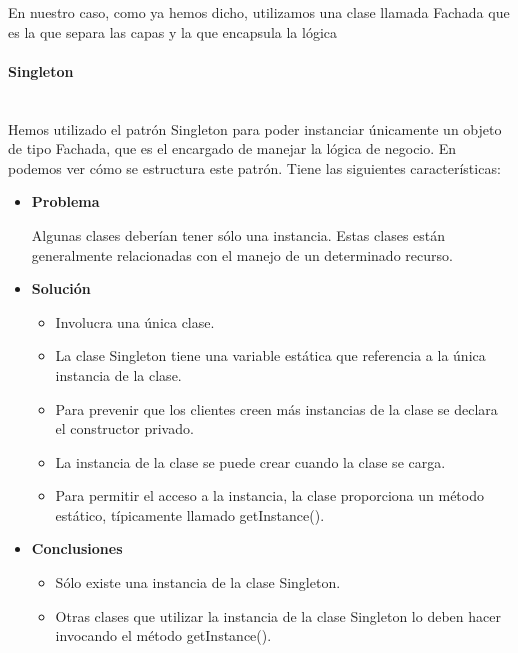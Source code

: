En nuestro caso, como ya hemos dicho, utilizamos una clase llamada Fachada que es la que separa las capas y la que encapsula la lógica 


\paragraph{Singleton}\mbox{} \\
\indent Hemos utilizado el patrón Singleton para poder instanciar únicamente un objeto de tipo Fachada, que es el encargado de manejar la lógica de negocio. En  podemos ver cómo se estructura este patrón. Tiene las siguientes características:



\begin{itemize}
\item \textbf{Problema}

Algunas clases deberían tener sólo una instancia. Estas clases están generalmente relacionadas con el manejo de un determinado recurso.

\item \textbf{Solución}

\begin{itemize}
\item Involucra una única clase.
\item La clase Singleton tiene una variable estática que referencia a la única instancia de la clase.
\item Para prevenir que los clientes creen más instancias de la clase se declara el constructor privado.
\item La instancia de la clase se puede crear cuando la clase se carga.
\item Para permitir el acceso a la instancia, la clase proporciona un método estático, típicamente llamado getInstance().
\end{itemize}

\item \textbf{Conclusiones}

\begin{itemize}
\item Sólo existe una instancia de la clase Singleton.
\item Otras clases que utilizar la instancia de la clase Singleton lo deben hacer invocando el método getInstance().
\end{itemize}
\end{itemize}

